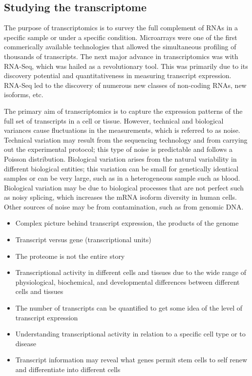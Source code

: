 \subsection{Studying the transcriptome}

The purpose of transcriptomics is to survey the full complement of RNAs in a specific sample or under a specific condition. Microarrays were one of the first commerically available technologies that allowed the simultaneous profiling of thousands of transcripts. The next major advance in transcriptomics was with RNA-Seq, which was hailed as a revolutionary tool\cite{pmid19015660}. This was primarily due to its discovery potential and quantitativeness in measuring transcript expression. RNA-Seq led to the discovery of numerous new classes of non-coding RNAs, new isoforms, etc.

The primary aim of transcriptomics is to capture the expression patterns of the full set of transcripts in a cell or tissue. However, technical and biological variances cause fluctuations in the measurements, which is referred to as noise. Technical variation may result from the sequencing technology and from carrying out the experimental protocol; this type of noise is predictable and follows a Poisson distribution. Biological variation arises from the natural variability in different biological entities; this variation can be small for genetically identical samples or can be very large, such as in a heterogeneous sample such as blood. Biological variation may be due to biological processes that are not perfect such as noisy splicing, which increases the mRNA isoform diversity in human cells\cite{pmid21151575}. Other sources of noise may be from contamination, such as from genomic DNA.

\begin{itemize}
   \item Complex picture behind transcript expression, the products of the genome
   \item Transcript versus gene (transcriptional units)
   \item The proteome is not the entire story
   \item Transcriptional activity in different cells and tissues due to the wide range of physiological, biochemical, and developmental differences between different cells and tissues
   \item The number of transcripts can be quantified to get some idea of the level of transcript expression
   \item Understanding transcriptional activity in relation to a specific cell type or to disease
   \item Transcript information may reveal what genes permit stem cells to self renew and differentiate into different cells
\end{itemize}

